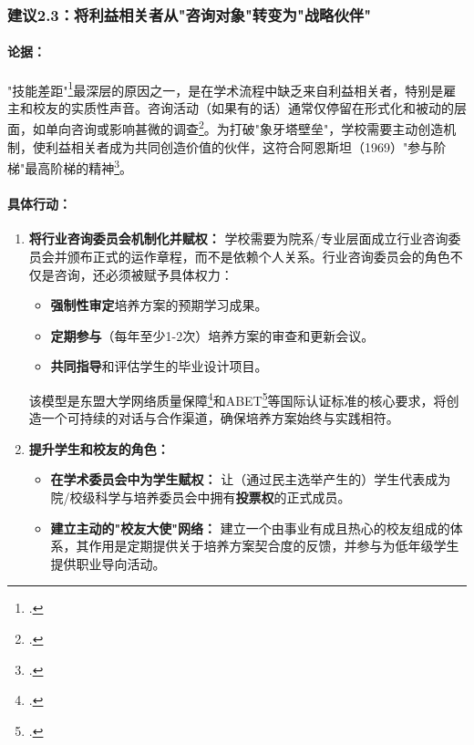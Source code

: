 

\subsubsection{建议2.3：将利益相关者从"咨询对象"转变为"战略伙伴"}

\paragraph{论据：}
"技能差距"\footcite{britishcouncil_skills_gap_2021}最深层的原因之一，是在学术流程中缺乏来自利益相关者，特别是雇主和校友的实质性声音。咨询活动（如果有的话）通常仅停留在形式化和被动的层面，如单向咨询或影响甚微的调查\footcite{vnujs_er_3848}。为打破"象牙塔壁垒"，学校需要主动创造机制，使利益相关者成为共同创造价值的伙伴，这符合阿恩斯坦（1969）"参与阶梯"最高阶梯的精神\footcite{Arnstein1969}。

\paragraph{具体行动：}
\begin{enumerate}
    \item \textbf{将行业咨询委员会机制化并赋权：}
    学校需要为院系/专业层面成立行业咨询委员会并颁布正式的运作章程，而不是依赖个人关系。行业咨询委员会的角色不仅是咨询，还必须被赋予具体权力：
        \begin{itemize}
            \item \textbf{强制性审定}培养方案的预期学习成果。
            \item \textbf{定期参与}（每年至少1-2次）培养方案的审查和更新会议。
            \item \textbf{共同指导}和评估学生的毕业设计项目。
        \end{itemize}
    该模型是东盟大学网络质量保障\footcite{aunqa_guidelines_v4}和ABET\footcite{abet_criteria}等国际认证标准的核心要求，将创造一个可持续的对话与合作渠道，确保培养方案始终与实践相符。

    \item \textbf{提升学生和校友的角色：}
        \begin{itemize}
            \item \textbf{在学术委员会中为学生赋权：} 让（通过民主选举产生的）学生代表成为院/校级科学与培养委员会中拥有\textbf{投票权}的正式成员。
            \item \textbf{建立主动的"校友大使"网络：} 建立一个由事业有成且热心的校友组成的体系，其作用是定期提供关于培养方案契合度的反馈，并参与为低年级学生提供职业导向活动。
        \end{itemize}
\end{enumerate}

